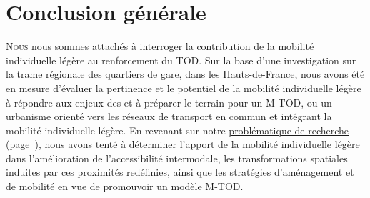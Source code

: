 \renewcommand{\thefigure}{C.\arabic{figure}} %
\renewcommand{\thetable}{C.\arabic{table}}
\setcounter{figure}{0}

\part*{Conclusion générale}
    \label{body:conclusion-generale}
    \begin{refsegment}

\lettrine[lines=3, findent=8pt, nindent=0pt]{ N}{ous} nous sommes attachés à interroger la contribution de la mobilité individuelle légère au renforcement du \acrshort{TOD}. Sur la base d'une investigation sur la trame régionale des quartiers de gare, dans les Hauts-de-France, nous avons été en mesure d'évaluer la pertinence et le potentiel de la mobilité individuelle légère à répondre aux enjeux des  et à préparer le terrain pour un \acrfull{M-TOD}, ou un urbanisme orienté vers les réseaux de transport en commun et intégrant la mobilité individuelle légère. En revenant sur notre \hyperref[introduction-generale:problematique-objectifs-hypotheses]{problématique de recherche} (page~\pageref{introduction-generale:problematique-objectifs-hypotheses}), nous avons tenté à déterminer l'apport de la mobilité individuelle légère dans l'amélioration de l'\gls{accessibilité intermodale}, les transformations spatiales induites par ces proximités redéfinies, ainsi que les stratégies d'aménagement et de mobilité en vue de promouvoir un modèle \acrshort{M-TOD}.


\end{refsegment}
